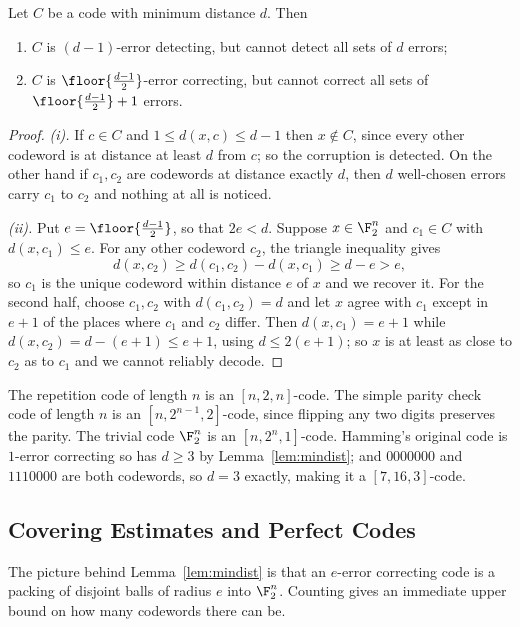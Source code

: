 \begin{lemma}\label{lem:mindist}
	Let $C$ be a code with minimum distance $d$. Then
	\begin{enumerate}[label=(\roman*)]
		\item $C$ is $(d-1)$-error detecting, but cannot detect all sets of $d$ errors;
		\item $C$ is $\floor{\frac{d-1}{2}}$-error correcting, but cannot correct all sets of $\floor{\frac{d-1}{2}}+1$ errors.
	\end{enumerate}
\end{lemma}

\begin{proof}
	\emph{(i).} If $c \in C$ and $1 \le d(x,c) \le d-1$ then $x \notin C$, since every other codeword is at distance at least $d$ from $c$; so the corruption is detected. On the other hand if $c_1, c_2$ are codewords at distance exactly $d$, then $d$ well-chosen errors carry $c_1$ to $c_2$ and nothing at all is noticed.

	\emph{(ii).} Put $e = \floor{\frac{d-1}{2}}$, so that $2e < d$. Suppose $x \in \F_2^n$ and $c_1 \in C$ with $d(x,c_1) \le e$. For any other codeword $c_2$, the triangle inequality gives
	$$d(x,c_2) \ge d(c_1,c_2) - d(x,c_1) \ge d - e > e,$$
	so $c_1$ is the unique codeword within distance $e$ of $x$ and we recover it. For the second half, choose $c_1, c_2$ with $d(c_1,c_2) = d$ and let $x$ agree with $c_1$ except in $e+1$ of the places where $c_1$ and $c_2$ differ. Then $d(x,c_1) = e+1$ while $d(x,c_2) = d - (e+1) \le e+1$, using $d \le 2(e+1)$; so $x$ is at least as close to $c_2$ as to $c_1$ and we cannot reliably decode.
\end{proof}

\begin{example}
	The repetition code of length $n$ is an $[n,2,n]$-code. The simple parity check code of length $n$ is an $[n,2^{n-1},2]$-code, since flipping any two digits preserves the parity. The trivial code $\F_2^n$ is an $[n,2^n,1]$-code. Hamming's original code is $1$-error correcting so has $d \ge 3$ by Lemma~\ref{lem:mindist}; and $0000000$ and $1110000$ are both codewords, so $d = 3$ exactly, making it a $[7,16,3]$-code.
\end{example}

\subsection{Covering Estimates and Perfect Codes}

The picture behind Lemma~\ref{lem:mindist} is that an $e$-error correcting code is a packing of disjoint balls of radius $e$ into $\F_2^n$. Counting gives an immediate upper bound on how many codewords there can be.

